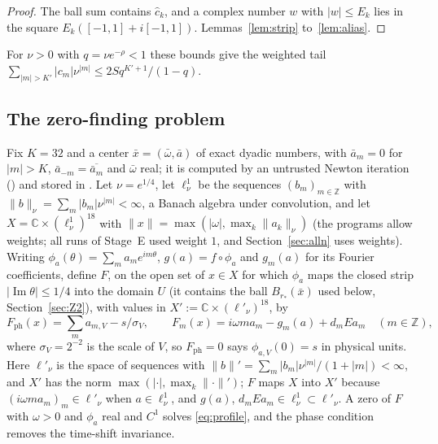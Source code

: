 \documentclass[11pt]{article}
\theoremstyle{definition}
\newcommand{\C}{\mathbb{C}}
\newcommand{\Z}{\mathbb{Z}}
\newcommand{\im}{\operatorname{Im}}
\begin{document}
\begin{proof}
The ball sum contains $\hat c_k$, and a complex number $w$ with $|w| \le E_k$ lies in the square $E_k([-1,1] + i[-1,1])$. Lemmas~\ref{lem:strip} to~\ref{lem:alias}.
\end{proof}

For $\nu > 0$ with $q = \nu e^{-\rho} < 1$ these bounds give the weighted tail $\sum_{|m| > K'} |c_m|\nu^{|m|} \le 2S q^{K'+1}/(1 - q)$.

\subsection{The zero-finding problem}\label{sec:F}

Fix $K = 32$ and a center $\bar x = (\bar\omega, \bar a)$ of exact dyadic numbers, with $\bar a_m = 0$ for $|m| > K$, $\bar a_{-m} = \overline{\bar a_m}$ and $\bar\omega$ real; it is computed by an untrusted Newton iteration () and stored in . Let $\nu = e^{1/4}$, let $\ell^1_\nu$ be the sequences $(b_m)_{m\in\Z}$ with $\|b\|_\nu = \sum_m |b_m|\nu^{|m|} < \infty$, a Banach algebra under convolution, and let $X = \C \times (\ell^1_\nu)^{18}$ with $\|x\| = \max(|\omega|, \max_k \|a_k\|_\nu)$ (the programs allow weights; all runs of Stage~E used weight $1$, and Section~\ref{sec:alln} uses weights). Writing $\phi_a(\theta) = \sum_m a_m e^{im\theta}$, $g(a) = f \circ \phi_a$ and $g_m(a)$ for its Fourier coefficients, define $F$, on the open set of $x \in X$ for which $\phi_a$ maps the closed strip $|\im\theta| \le 1/4$ into the domain $U$ (it contains the ball $B_{r_*}(\bar x)$ used below, Section~\ref{sec:Z2}), with values in $X' := \C \times (\ell'_\nu)^{18}$, by
\begin{equation}\label{eq:F}
  F_{\mathrm{ph}}(x) = \sum_m a_{m,V} - s/\sigma_V, \qquad F_m(x) = i\omega m a_m - g_m(a) + d_m E a_m \quad (m \in \Z),
\end{equation}
where $\sigma_V = 2^{-2}$ is the scale of $V$, so $F_{\mathrm{ph}} = 0$ says $\phi_{a,V}(0) = s$ in physical units. Here $\ell'_\nu$ is the space of sequences with $\|b\|' = \sum_m |b_m|\nu^{|m|}/(1 + |m|) < \infty$, and $X'$ has the norm $\max(|\cdot|, \max_k\|\cdot\|')$; $F$ maps $X$ into $X'$ because $(i\omega ma_m)_m \in \ell'_\nu$ when $a \in \ell^1_\nu$, and $g(a)$, $d_mEa_m \in \ell^1_\nu \subset \ell'_\nu$. A zero of $F$ with $\omega > 0$ and $\phi_a$ real and $C^1$ solves \eqref{eq:profile}, and the phase condition removes the time-shift invariance.
\end{document}
